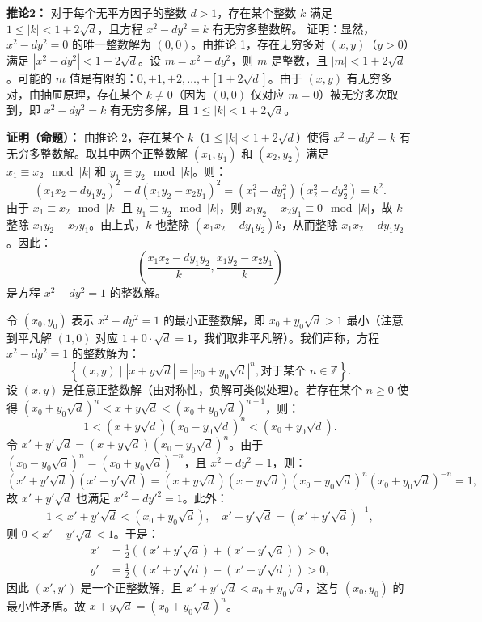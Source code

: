 \documentclass[UTF8]{ctexart}
\begin{document}
\begin{enumerate}
\textbf{推论2：} 对于每个无平方因子的整数 \(d > 1\)，存在某个整数 \(k\) 满足 \(1 \leq |k| < 1 + 2\sqrt{d}\)，且方程 \(x^2 - d y^2 = k\) 有无穷多整数解。  
证明：显然，\(x^2 - d y^2 = 0\) 的唯一整数解为 \((0, 0)\)。由推论 1，存在无穷多对 \((x, y)\)（\(y > 0\)）满足 \(\left| x^2 - d y^2 \right| < 1 + 2\sqrt{d}\)。设 \(m = x^2 - d y^2\)，则 \(m\) 是整数，且 \(|m| < 1 + 2\sqrt{d}\)。可能的 \(m\) 值是有限的：\(0, \pm 1, \pm 2, \dots, \pm [1 + 2\sqrt{d}]\)。由于 \((x, y)\) 有无穷多对，由抽屉原理，存在某个 \(k \neq 0\)（因为 \((0, 0)\) 仅对应 \(m = 0\)）被无穷多次取到，即 \(x^2 - d y^2 = k\) 有无穷多解，且 \(1 \leq |k| < 1 + 2\sqrt{d}\)。

\textbf{证明（命题）：} 由推论 2，存在某个 \(k\)（\(1 \leq |k| < 1 + 2\sqrt{d}\)）使得 \(x^2 - d y^2 = k\) 有无穷多整数解。取其中两个正整数解 \((x_1, y_1)\) 和 \((x_2, y_2)\) 满足 \(x_1 \equiv x_2 \mod |k|\) 和 \(y_1 \equiv y_2 \mod |k|\)。则：
\[
(x_1 x_2 - d y_1 y_2)^2 - d (x_1 y_2 - x_2 y_1)^2 = (x_1^2 - d y_1^2)(x_2^2 - d y_2^2) = k^2.
\]
由于 \(x_1 \equiv x_2 \mod |k|\) 且 \(y_1 \equiv y_2 \mod |k|\)，则 \(x_1 y_2 - x_2 y_1 \equiv 0 \mod |k|\)，故 \(k\) 整除 \(x_1 y_2 - x_2 y_1\)。由上式，\(k\) 也整除 \((x_1 x_2 - d y_1 y_2) k\)，从而整除 \(x_1 x_2 - d y_1 y_2\)。因此：
\[
\left( \frac{x_1 x_2 - d y_1 y_2}{k}, \frac{x_1 y_2 - x_2 y_1}{k} \right)
\]
是方程 \(x^2 - d y^2 = 1\) 的整数解。

令 \((x_0, y_0)\) 表示 \(x^2 - d y^2 = 1\) 的最小正整数解，即 \(x_0 + y_0 \sqrt{d} > 1\) 最小（注意到平凡解 \((1, 0)\) 对应 \(1 + 0 \cdot \sqrt{d} = 1\)，我们取非平凡解）。我们声称，方程 \(x^2 - d y^2 = 1\) 的整数解为：
\[
\left\{ (x, y) \mid |x + y \sqrt{d}| = |x_0 + y_0 \sqrt{d}|^n, \text{对于某个 } n \in \mathbb{Z} \right\}.
\]
设 \((x, y)\) 是任意正整数解（由对称性，负解可类似处理）。若存在某个 \(n \geq 0\) 使得 \((x_0 + y_0 \sqrt{d})^n < x + y \sqrt{d} < (x_0 + y_0 \sqrt{d})^{n+1}\)，则：
\[
1 < (x + y \sqrt{d}) (x_0 - y_0 \sqrt{d})^n < (x_0 + y_0 \sqrt{d}).
\]
令 \(x' + y' \sqrt{d} = (x + y \sqrt{d}) (x_0 - y_0 \sqrt{d})^n\)。由于 \((x_0 - y_0 \sqrt{d})^n = (x_0 + y_0 \sqrt{d})^{-n}\)，且 \(x^2 - d y^2 = 1\)，则：
\[
(x' + y' \sqrt{d})(x' - y' \sqrt{d}) = (x + y \sqrt{d})(x - y \sqrt{d}) (x_0 - y_0 \sqrt{d})^n (x_0 + y_0 \sqrt{d})^{-n} = 1,
\]
故 \(x' + y' \sqrt{d}\) 也满足 \(x'^2 - d y'^2 = 1\)。此外：
\[
1 < x' + y' \sqrt{d} < (x_0 + y_0 \sqrt{d}), \quad x' - y' \sqrt{d} = (x' + y' \sqrt{d})^{-1},
\]
则 \(0 < x' - y' \sqrt{d} < 1\)。于是：
\[
\begin{aligned}
x' &= \frac{1}{2} \left( (x' + y' \sqrt{d}) + (x' - y' \sqrt{d}) \right) > 0, \\
y' &= \frac{1}{2} \left( (x' + y' \sqrt{d}) - (x' - y' \sqrt{d}) \right) > 0,
\end{aligned}
\]
因此 \((x', y')\) 是一个正整数解，且 \(x' + y' \sqrt{d} < x_0 + y_0 \sqrt{d}\)，这与 \((x_0, y_0)\) 的最小性矛盾。故 \(x + y \sqrt{d} = (x_0 + y_0 \sqrt{d})^n\)。


\end{enumerate}
\end{document}
